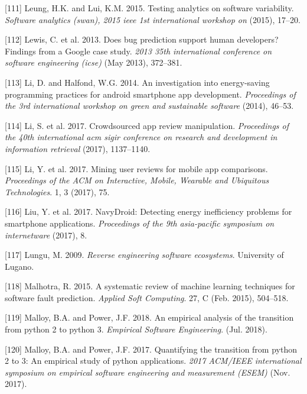 \documentclass[]{book}
\begin{document}
\hypertarget{ref-leung2015testing}{}
{[}111{]} Leung, H.K. and Lui, K.M. 2015. Testing analytics on software
variability. \emph{Software analytics (swan), 2015 ieee 1st
international workshop on} (2015), 17--20.

\hypertarget{ref-Lewis2013}{}
{[}112{]} Lewis, C. et al. 2013. Does bug prediction support human
developers? Findings from a Google case study. \emph{2013 35th
international conference on software engineering (icse)} (May 2013),
372--381.

\hypertarget{ref-LH2014}{}
{[}113{]} Li, D. and Halfond, W.G. 2014. An investigation into
energy-saving programming practices for android smartphone app
development. \emph{Proceedings of the 3rd international workshop on
green and sustainable software} (2014), 46--53.

\hypertarget{ref-i2017crowdsourced}{}
{[}114{]} Li, S. et al. 2017. Crowdsourced app review manipulation.
\emph{Proceedings of the 40th international acm sigir conference on
research and development in information retrieval} (2017), 1137--1140.

\hypertarget{ref-li2017mining}{}
{[}115{]} Li, Y. et al. 2017. Mining user reviews for mobile app
comparisons. \emph{Proceedings of the ACM on Interactive, Mobile,
Wearable and Ubiquitous Technologies}. 1, 3 (2017), 75.

\hypertarget{ref-LWXM2017}{}
{[}116{]} Liu, Y. et al. 2017. NavyDroid: Detecting energy inefficiency
problems for smartphone applications. \emph{Proceedings of the 9th
asia-pacific symposium on internetware} (2017), 8.

\hypertarget{ref-Lungu2009}{}
{[}117{]} Lungu, M. 2009. \emph{Reverse engineering software
ecosystems}. University of Lugano.

\hypertarget{ref-Malhotra2015}{}
{[}118{]} Malhotra, R. 2015. A systematic review of machine learning
techniques for software fault prediction. \emph{Applied Soft Computing}.
27, C (Feb. 2015), 504--518.

\hypertarget{ref-Malloy2018}{}
{[}119{]} Malloy, B.A. and Power, J.F. 2018. An empirical analysis of
the transition from python 2 to python 3. \emph{Empirical Software
Engineering}. (Jul. 2018).

\hypertarget{ref-Malloy2017}{}
{[}120{]} Malloy, B.A. and Power, J.F. 2017. Quantifying the transition
from python 2 to 3: An empirical study of python applications.
\emph{2017 ACM/IEEE international symposium on empirical software
engineering and measurement (ESEM)} (Nov. 2017).
\end{document}
